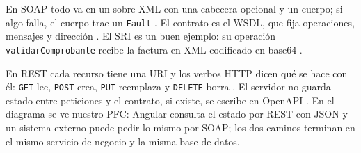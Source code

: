 En SOAP todo va en un sobre XML con una cabecera opcional y un cuerpo; si algo falla, el cuerpo trae un \texttt{Fault} \cite{w3c_soap12}. El contrato es el WSDL, que fija operaciones, mensajes y dirección \cite{w3c_wsdl11}. El SRI es un buen ejemplo: su operación \texttt{validarComprobante} recibe la factura en XML codificado en base64 \cite{sri_recepcion}.

En REST cada recurso tiene una URI y los verbos HTTP dicen qué se hace con él: \texttt{GET} lee, \texttt{POST} crea, \texttt{PUT} reemplaza y \texttt{DELETE} borra \cite{rfc9110}. El servidor no guarda estado entre peticiones \cite{fielding2000} y el contrato, si existe, se escribe en OpenAPI \cite{openapi31}. En el diagrama se ve nuestro PFC: Angular consulta el estado por REST con JSON y un sistema externo puede pedir lo mismo por SOAP; los dos caminos terminan en el mismo servicio de negocio y la misma base de datos.
